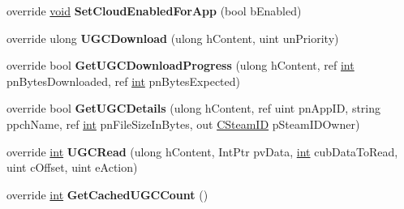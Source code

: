 \begin{DoxyCompactItemize}
\item 
\hypertarget{classValve_1_1Steamworks_1_1CSteamRemoteStorage_a4e132e15729b8b74cb54186077e85e50}{}override \hyperlink{SDL__audio_8h_a52835ae37c4bb905b903cbaf5d04b05f}{void} {\bfseries Set\+Cloud\+Enabled\+For\+App} (bool b\+Enabled)\label{classValve_1_1Steamworks_1_1CSteamRemoteStorage_a4e132e15729b8b74cb54186077e85e50}

\item 
\hypertarget{classValve_1_1Steamworks_1_1CSteamRemoteStorage_a720d4701631b54a0edb611cbfdc01c48}{}override ulong {\bfseries U\+G\+C\+Download} (ulong h\+Content, uint un\+Priority)\label{classValve_1_1Steamworks_1_1CSteamRemoteStorage_a720d4701631b54a0edb611cbfdc01c48}

\item 
\hypertarget{classValve_1_1Steamworks_1_1CSteamRemoteStorage_aec53eb39d92d27a862b8a22edd54b93d}{}override bool {\bfseries Get\+U\+G\+C\+Download\+Progress} (ulong h\+Content, ref \hyperlink{SDL__thread_8h_a6a64f9be4433e4de6e2f2f548cf3c08e}{int} pn\+Bytes\+Downloaded, ref \hyperlink{SDL__thread_8h_a6a64f9be4433e4de6e2f2f548cf3c08e}{int} pn\+Bytes\+Expected)\label{classValve_1_1Steamworks_1_1CSteamRemoteStorage_aec53eb39d92d27a862b8a22edd54b93d}

\item 
\hypertarget{classValve_1_1Steamworks_1_1CSteamRemoteStorage_a59996632ff9724d5a6408879cd85b7c2}{}override bool {\bfseries Get\+U\+G\+C\+Details} (ulong h\+Content, ref uint pn\+App\+I\+D, string ppch\+Name, ref \hyperlink{SDL__thread_8h_a6a64f9be4433e4de6e2f2f548cf3c08e}{int} pn\+File\+Size\+In\+Bytes, out \hyperlink{structValve_1_1Steamworks_1_1CSteamID}{C\+Steam\+I\+D} p\+Steam\+I\+D\+Owner)\label{classValve_1_1Steamworks_1_1CSteamRemoteStorage_a59996632ff9724d5a6408879cd85b7c2}

\item 
\hypertarget{classValve_1_1Steamworks_1_1CSteamRemoteStorage_a45bba73c094d2a4adab50ced4aebf8e0}{}override \hyperlink{SDL__thread_8h_a6a64f9be4433e4de6e2f2f548cf3c08e}{int} {\bfseries U\+G\+C\+Read} (ulong h\+Content, Int\+Ptr pv\+Data, \hyperlink{SDL__thread_8h_a6a64f9be4433e4de6e2f2f548cf3c08e}{int} cub\+Data\+To\+Read, uint c\+Offset, uint e\+Action)\label{classValve_1_1Steamworks_1_1CSteamRemoteStorage_a45bba73c094d2a4adab50ced4aebf8e0}

\item 
\hypertarget{classValve_1_1Steamworks_1_1CSteamRemoteStorage_a4a4c510da863ea6a34aadf736bdceb9a}{}override \hyperlink{SDL__thread_8h_a6a64f9be4433e4de6e2f2f548cf3c08e}{int} {\bfseries Get\+Cached\+U\+G\+C\+Count} ()\label{classValve_1_1Steamworks_1_1CSteamRemoteStorage_a4a4c510da863ea6a34aadf736bdceb9a}


\end{DoxyCompactItemize}
